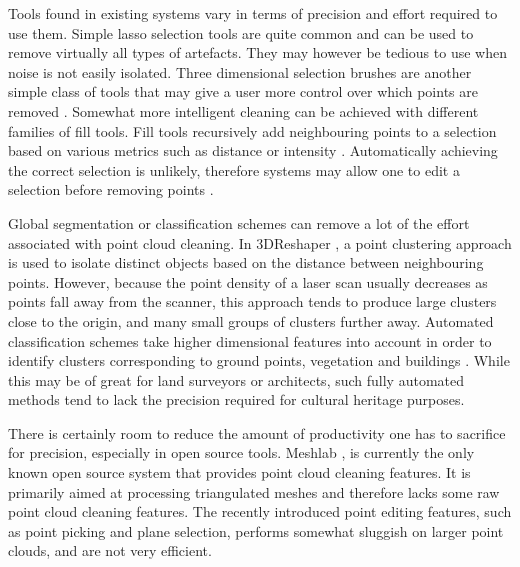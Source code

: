 \documentclass[10pt,twocolumn]{article}
\begin{document}

Tools found in existing systems vary in terms of precision and effort required to use them. Simple lasso selection tools are quite common \cite{Pointools2012,Leica2012,Technodigit2012} and can be used to remove virtually all types of artefacts. They may however be tedious to use when noise is not easily isolated. Three dimensional selection brushes are another simple class of tools that may give a user more control over which points are removed \cite{Pointools2012}. Somewhat more intelligent cleaning can be achieved with different families of fill tools. Fill tools recursively add neighbouring points to a selection based on various metrics such as distance or intensity \cite{Pointools2012}. Automatically achieving the correct selection is unlikely, therefore systems may allow one to edit a selection before removing points \cite{Pointools2012}.

Global segmentation or classification schemes can remove a lot of the effort associated with point cloud cleaning. In 3DReshaper \cite{Technodigit2012}, a point clustering approach is used to isolate distinct objects based on the distance between neighbouring points. However, because the point density of a laser scan usually decreases as points fall away from the scanner, this approach tends to produce large clusters close to the origin, and many small groups of clusters further away. Automated classification schemes take higher dimensional features into account in order to identify clusters corresponding to ground points, vegetation and buildings \cite{Terrasolid2012,VirtualGrid2012,Carlson2012}. While this may be of great for land surveyors or architects, such fully automated methods tend to lack the precision required for cultural heritage purposes.

There is certainly room to reduce the amount of productivity one has to sacrifice for precision, especially in open source tools. Meshlab \cite{VisualComputingLaboratory2012}, is currently the only known open source system that provides point cloud cleaning features. It is primarily aimed at processing triangulated meshes and therefore lacks some raw point cloud cleaning features. The recently introduced point editing features, such as point picking and plane selection, performs somewhat sluggish on larger point clouds, and are not very efficient.

\end{document}
